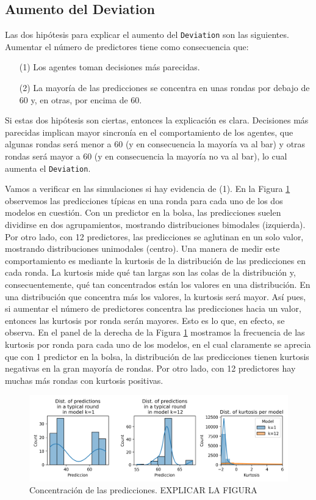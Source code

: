 \documentclass[11pt]{amsart}
\begin{document}
\subsection{Aumento del Deviation}
Las dos hipótesis para explicar el aumento del \texttt{Deviation} son las siguientes. Aumentar el número de predictores tiene como consecuencia que:

\begin{itemize}
\item[(1)] Los agentes toman decisiones más parecidas.
\item[(2)] La mayoría de las predicciones se concentra en unas rondas por debajo de 60 y, en otras, por encima de 60.
\end{itemize}

Si estas dos hipótesis son ciertas, entonces la explicación es clara. Decisiones más parecidas implican mayor sincronía en el comportamiento de los agentes, que algunas rondas será menor a 60 (y en consecuencia la mayoría va al bar) y otras rondas será mayor a 60 (y en consecuencia la mayoría no va al bar), lo cual aumenta el \texttt{Deviation}. 

Vamos a verificar en las simulaciones si hay evidencia de (1). En la Figura \ref{fig:(1)} observemos las predicciones típicas en una ronda para cada uno de los dos modelos en cuestión. Con un predictor en la bolsa, las predicciones suelen dividirse en dos agrupamientos, mostrando distribuciones bimodales (izquierda). Por otro lado, con 12 predictores, las predicciones se aglutinan en un solo valor, mostrando distribuciones unimodales (centro). Una manera de medir este comportamiento es mediante la kurtosis de la distribución de las predicciones en cada ronda. La kurtosis mide qué tan largas son las colas de la distribución y, consecuentemente, qué tan concentrados están los valores en una distribución. En una distribución que concentra más los valores, la kurtosis será mayor. Así pues, si aumentar el número de predictores concentra las predicciones hacia un valor, entonces las kurtosis por ronda serán mayores. Esto es lo que, en efecto, se observa. En el panel de la derecha de la Figura \ref{fig:(1)} mostramos la frecuencia de las kurtosis por ronda para cada uno de los modelos, en el cual claramente se aprecia que con 1 predictor en la bolsa, la distribución de las predicciones tienen kurtosis negativas en la gran mayoría de rondas. Por otro lado, con 12 predictores hay muchas más rondas con kurtosis positivas.

\begin{figure}
\begin{center}
\includegraphics[width=.9\linewidth]{./Figuras/Figura3.png}
\caption{Concentración de las predicciones. EXPLICAR LA FIGURA}\label{fig:(1)}
\end{center}
\end{figure}
\end{document}
